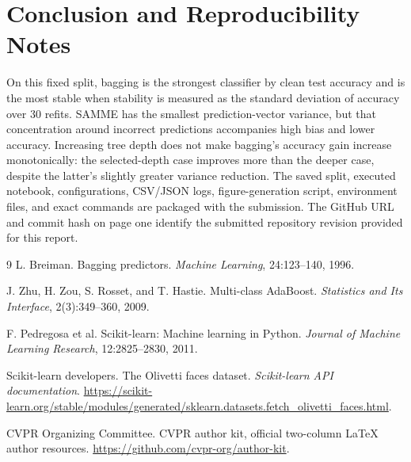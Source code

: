 \documentclass[10pt,twocolumn,letterpaper]{article}
\begin{document}
\section{Conclusion and Reproducibility Notes}
On this fixed split, bagging is the strongest classifier by clean test accuracy and is the most stable when stability is measured as the standard deviation of accuracy over 30 refits. SAMME has the smallest prediction-vector variance, but that concentration around incorrect predictions accompanies high bias and lower accuracy. Increasing tree depth does not make bagging's accuracy gain increase monotonically: the selected-depth case improves more than the deeper case, despite the latter's slightly greater variance reduction. The saved split, executed notebook, configurations, CSV/JSON logs, figure-generation script, environment files, and exact commands are packaged with the submission. The GitHub URL and commit hash on page one identify the submitted repository revision provided for this report.

\clearpage
\begin{thebibliography}{9}
L. Breiman. Bagging predictors. \emph{Machine Learning}, 24:123--140, 1996.

J. Zhu, H. Zou, S. Rosset, and T. Hastie. Multi-class AdaBoost. \emph{Statistics and Its Interface}, 2(3):349--360, 2009.

F. Pedregosa et al. Scikit-learn: Machine learning in Python. \emph{Journal of Machine Learning Research}, 12:2825--2830, 2011.

Scikit-learn developers. The Olivetti faces dataset. \emph{Scikit-learn API documentation}. \url{https://scikit-learn.org/stable/modules/generated/sklearn.datasets.fetch_olivetti_faces.html}.

CVPR Organizing Committee. CVPR author kit, official two-column LaTeX author resources. \url{https://github.com/cvpr-org/author-kit}.
\end{thebibliography}
\end{document}
